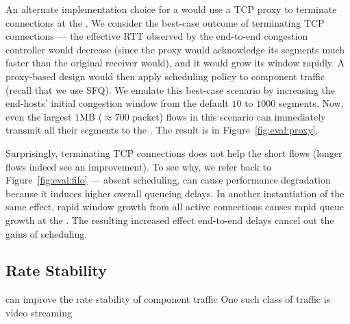 

 An alternate implementation choice for a \name would use a TCP proxy to terminate connections at the \inbox.
We consider the best-case outcome of terminating TCP connections --- the effective RTT observed by the end-to-end congestion controller would decrease (since the proxy would acknowledge its segments much faster than the original receiver would), and it would grow its window rapidly.
A proxy-based design would then apply scheduling policy to component traffic (recall that we use SFQ).
We emulate this best-case scenario by increasing the end-hosts' initial congestion window from the default $10$ to $1000$ segments.
Now, even the largest $1$MB ($\approx700$ packet) flows in this scenario can immediately transmit all their segments to the \inbox.
The result is in Figure~\ref{fig:eval:proxy}.



Surprisingly, terminating TCP connections does not help the short flows (longer flows indeed see an improvement). 
To see why, we refer back to Figure~\ref{fig:eval:fifo} --- absent scheduling, \name can cause performance degradation because it induces higher overall queueing delays.
In another instantiation of the same effect, rapid window growth from all active connections causes rapid queue growth at the \inbox. The resulting increased effect end-to-end delays cancel out the gains of scheduling.

\subsection{Rate Stability}\label{s:eval:ratestable}

\begin{outline}
    \1 \name can improve the rate stability of component traffic
    \1 One such class of traffic is video streaming
\end{outline}

